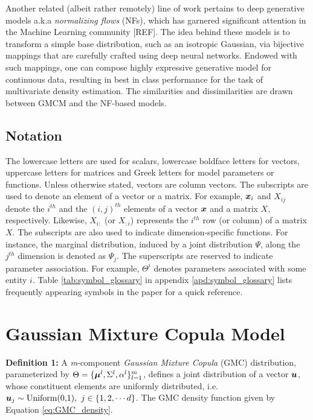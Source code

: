 \documentclass{article}
\begin{document}
Another related (albeit rather remotely) line of work pertains to deep generative models a.k.a \emph{normalizing flows} (NFs), which has garnered significant attention in  the Machine Learning community [REF]. The idea behind these models is to transform a simple base distribution, such as an isotropic Gaussian, via bijective mappings that are carefully crafted using deep neural networks. Endowed with such mappings, one can compose highly expressive generative model for continuous data, resulting in best in class performance for the task of multivariate density estimation. The similarities and dissimilarities are drawn between GMCM and the NF-based models.   

\subsection{Notation}\label{subsec:Notation}
The lowercase letters are used for scalars, lowercase boldface letters for vectors, uppercase letters for matrices and Greek letters for model parameters or functions. Unless otherwise stated, vectors are column vectors. The subscripts are used to denote an element of a vector or a matrix. For example, $\boldsymbol{x}_i$ and $X_{ij}$ denote the $i^{th}$ and the $(i,j)^{th}$ elements of a vector $\boldsymbol{x}$ and a matrix $X$, respectively. Likewise, $X_{i:}$ (or $X_{:i}$) represents the $i^{th}$ row (or column) of a matrix $X$. The subscripts are also used to indicate dimension-specific functions. For instance, the marginal distribution, induced by a joint distribution $\Psi$, along the $j^{th}$ dimension is denoted as $\Psi_j$.  The superscripts are reserved to indicate parameter association. For example, $\Theta^i$ denotes parameters associated with some entity $i$. Table \ref{tab:symbol_glossary} in appendix \ref{apd:symbol_glossary} lists frequently appearing symbols in the paper for a quick reference.

\section{Gaussian Mixture Copula Model}\label{sec:GMC_description}
\textbf{Definition 1:}  A \emph{m}-component \emph{Gaussian Mixture Copula} (GMC) distribution, parameterized by $\Theta = \{\boldsymbol{\mu}^l, \Sigma^l, \alpha^l\}_{l=1}^m$, defines a joint distribution of a vector $\boldsymbol{u}$, whose constituent elements are uniformly distributed, i.e. $ \boldsymbol{u}_j \sim \text{Uniform(0,1)}, \  j\in \{1,2,\cdots d\}$. The GMC density function given by Equation \eqref{eq:GMC_density}.
\end{document}
